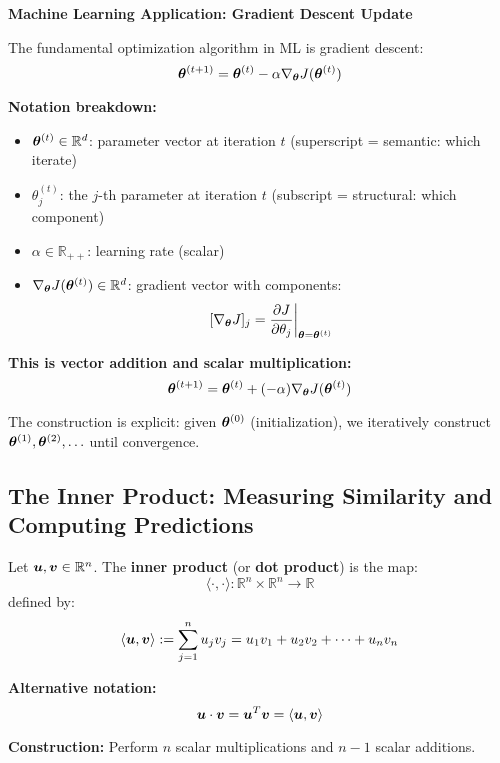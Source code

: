 \begin{mlbox}
    \textbf{Machine Learning Application: Gradient Descent Update}

    The fundamental optimization algorithm in ML is gradient descent:
    \[
        \bm{\theta}^{(t+1)} = \bm{\theta}^{(t)} - \alpha \nabla_{\bm{\theta}} J(\bm{\theta}^{(t)})
    \]

    \textbf{Notation breakdown:}
    \begin{itemize}
        \item $\bm{\theta}^{(t)} \in \mathbb{R}^d$: parameter vector at iteration $t$ (superscript = semantic: which iterate)
        \item $\theta_j^{(t)}$: the $j$-th parameter at iteration $t$ (subscript = structural: which component)
        \item $\alpha \in \mathbb{R}_{++}$: learning rate (scalar)
        \item $\nabla_{\bm{\theta}} J(\bm{\theta}^{(t)}) \in \mathbb{R}^d$: gradient vector with components:
              \[
                  [\nabla_{\bm{\theta}} J]_j = \frac{\partial J}{\partial \theta_j}\bigg|_{\bm{\theta} = \bm{\theta}^{(t)}}
              \]
    \end{itemize}

    \textbf{This is vector addition and scalar multiplication:}
    \[
        \bm{\theta}^{(t+1)} = \bm{\theta}^{(t)} + (-\alpha) \nabla_{\bm{\theta}} J(\bm{\theta}^{(t)})
    \]

    The construction is explicit: given $\bm{\theta}^{(0)}$ (initialization), we
    iteratively construct $\bm{\theta}^{(1)}, \bm{\theta}^{(2)}, \ldots$ until
    convergence.
\end{mlbox}

\subsection{The Inner Product: Measuring Similarity and Computing Predictions}

\begin{definition}\label{def:inner-product}
    Let $\bm{u}, \bm{v} \in \mathbb{R}^n$. The \textbf{inner product} (or \textbf{dot product}) is the map:
    \[
        \langle \cdot, \cdot \rangle: \mathbb{R}^n \times \mathbb{R}^n \to \mathbb{R}
    \]
    defined by:
    \[
        \langle \bm{u}, \bm{v} \rangle := \sum_{j=1}^{n} u_j v_j = u_1 v_1 + u_2 v_2 + \cdots + u_n v_n
    \]

    \textbf{Alternative notation:}
    \[
        \bm{u} \cdot \bm{v} = \bm{u}^T \bm{v} = \langle \bm{u}, \bm{v} \rangle
    \]

    \textbf{Construction:} Perform $n$ scalar multiplications and $n-1$ scalar additions.
\end{definition}

